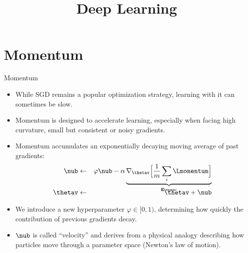 




\newcommand{\titlefigure}{figure/momentum.png}
\newcommand{\learninggoals}{
  \item SGD with Momentum
  \item Learning Rate Schedules
  \item Adaptive Learning Rates
  \item Batch Normalization
}

\title{Deep Learning}
\date{}




\section{Momentum}
\begin{vbframe}{Momentum}
  \begin{itemize}
    \item While SGD remains a popular optimization strategy, learning with it can sometimes be slow. 
    \item Momentum is designed to accelerate learning, especially when facing high curvature, small but consistent or noisy gradients.
    \item Momentum accumulates an exponentially decaying moving average of past gradients:
      \begin{eqnarray*} 
        \nub &\leftarrow& \varphi \nub - \alpha \underbrace{\nabla_{\thetav} \Big[\frac{1}{m} \sum_{i} \Lmomentum \Big]}_{\mathbf{g}_{\thetav}}\\[-0.3cm]
        \thetav &\leftarrow& \thetav + \nub
      \end{eqnarray*}
    \item We introduce a new hyperparameter $\varphi \in [0, 1)$, determining how quickly the contribution of previous gradients decay.
    \item $\nub$ is called \enquote{velocity} and derives from a physical analogy describing how particles move through a parameter space (Newton's law of motion).
  \end{itemize}
\end{vbframe}

